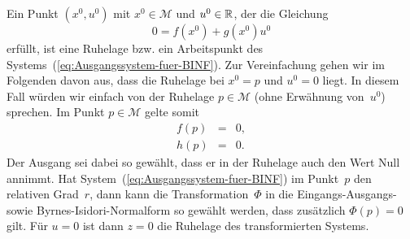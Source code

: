 Ein Punkt $(x^{0},u^{0})$ mit $x^{0}\in\mathcal{M}$ und $u^{0}\in{\mathbb{R}}$,
der die Gleichung 
\[
0=f(x^{0})+g(x^{0})u^{0}
\]
erfüllt, ist eine Ruhelage bzw. ein Arbeitspunkt
des Systems~(\ref{eq:Ausgangssystem-fuer-BINF}). Zur Vereinfachung
gehen wir im Folgenden davon aus, dass die Ruhelage bei $x^{0}=p$
und $u^{0}=0$ liegt. In diesem Fall würden wir einfach von der Ruhelage
$p\in\mathcal{M}$ (ohne Erwähnung von~$u^{0}$) sprechen. Im Punkt
$p\in\mathcal{M}$ gelte somit 
\begin{eqnarray}
f(p) & = & 0,\label{eq:Ruhelage-x}\\
h(p) & = & 0.\label{eq:Ruhelage-y}
\end{eqnarray}
Der Ausgang sei dabei so gewählt, dass er in der Ruhelage auch den
Wert Null annimmt. Hat System~(\ref{eq:Ausgangssystem-fuer-BINF})
im Punkt~$p$ den relativen Grad~$r$, dann kann die Transformation~$\Phi$
in die Eingangs-Ausgangs- sowie Byrnes-Isidori-Normalform so gewählt
werden, dass zusätzlich $\Phi(p)=0$ gilt. Für $u=0$ ist dann $z=0$
die Ruhelage des transformierten Systems.

